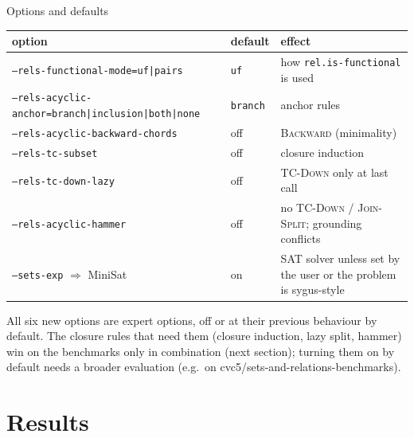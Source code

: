 \documentclass[aspectratio=169]{beamer}
\newcommand{\sm}[1]{\texttt{#1}}
\newcommand{\rn}[1]{\textsc{#1}}
\begin{document}
\begin{frame}{Options and defaults}
  \footnotesize
  \begin{tabular}{@{}llL{5.2cm}@{}}
    \toprule
    option & default & effect \\
    \midrule
    \sm{--rels-functional-mode=uf|pairs} & \sm{uf} & how \sm{rel.is-functional} is used \\
    \sm{--rels-acyclic-anchor=branch|inclusion|both|none} & \sm{branch} & anchor rules \\
    \sm{--rels-acyclic-backward-chords} & off & \rn{Backward} (minimality) \\
    \sm{--rels-tc-subset} & off & closure induction \\
    \sm{--rels-tc-down-lazy} & off & \rn{TC-Down} only at last call \\
    \sm{--rels-acyclic-hammer} & off & no \rn{TC-Down} / \rn{Join-Split}; grounding conflicts \\
    \midrule
    \sm{--sets-exp} $\Rightarrow$ MiniSat & on & SAT solver unless set by the user or the
      problem is sygus-style \\
    \bottomrule
  \end{tabular}
  \bigskip

  \small
  All six new options are expert options, off or at their previous behaviour by default. The
  closure rules that need them (closure induction, lazy split, hammer) win on the benchmarks
  only in combination (next section); turning them on by default needs a broader evaluation
  (e.g.\ on cvc5/sets-and-relations-benchmarks).
\end{frame}

\section{Results}
\end{document}
